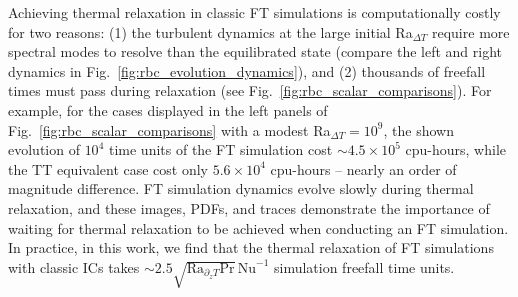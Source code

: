 \documentclass[aps, pre, onecolumn, nofootinbib, notitlepage, groupedaddress, amsfonts, amssymb, amsmath, longbibliography, superscriptaddress]{revtex4-1}
\newcommand{\ea}[1]{{\color{red} #1}}
\begin{document}
Achieving thermal relaxation in \ea{classic} FT simulations is computationally costly for two reasons: (1) the turbulent dynamics at the large initial Ra$_{\Delta T}$ require more spectral modes to resolve than the equilibrated state (compare the left and right dynamics in Fig.~\ref{fig:rbc_evolution_dynamics}), and (2) thousands of freefall times must pass during relaxation (see Fig.~\ref{fig:rbc_scalar_comparisons}).
For example, for the cases displayed in the left panels of Fig.~\ref{fig:rbc_scalar_comparisons} with a modest Ra$_{\Delta T} = 10^9$, the shown evolution of $10^4$ time units of the FT simulation cost $\sim 4.5 \times 10^5$ cpu-hours, while the TT equivalent case cost only $5.6 \times 10^4$ cpu-hours -- nearly an order of magnitude difference.
FT simulation dynamics evolve slowly during thermal relaxation, and these images, PDFs, and traces demonstrate the importance of waiting for thermal relaxation to be achieved when conducting an FT simulation.
\ea{In practice, in this work, we find that the thermal relaxation of FT simulations with classic ICs takes $\sim 2.5\sqrt{\text{Ra}_{\partial_z T} \text{Pr}}\,\text{Nu}^{-1}$ simulation freefall time units.}
\end{document}
